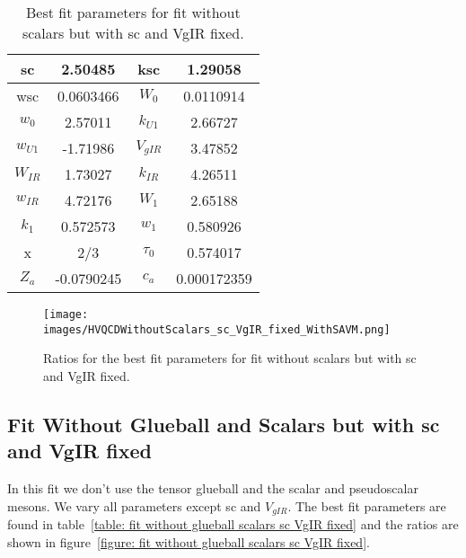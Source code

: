 \documentclass[10 pt]{article}
\begin{document}
\begin{table}
\centering
\begin{tabular}{ | c | c | c | c |}
\hline
sc & 2.50485 & ksc & 1.29058 \\
\hline
wsc & 0.0603466 & $W_0$ & 0.0110914 \\
\hline
$w_0$ & 2.57011 & $k_{U1}$ & 2.66727  \\
\hline
$w_{U1}$ & -1.71986 & $V_{gIR}$ & 3.47852 \\
\hline
$W_{IR}$ & 1.73027 & $k_{IR}$ & 4.26511 \\
\hline
$w_{IR}$ & 4.72176 & $W_1$ & 2.65188 \\
\hline
$k_1$ & 0.572573 & $w_1$ & 0.580926 \\
\hline
x & 2/3& $\tau_0$ & 0.574017\\
\hline
$Z_a$ & -0.0790245 & $c_a$ & 0.000172359 \\
\hline
\end{tabular}
\caption{Best fit parameters for fit without scalars but with sc and VgIR fixed.}
\label{table: fit without scalars sc VgIR fixed} 
\end{table}

\begin{figure}
  \center
  \texttt{[image: images/HVQCDWithoutScalars\_sc\_VgIR\_fixed\_WithSAVM.png]} 
  \caption{Ratios for the best fit parameters for fit without scalars but with sc and VgIR fixed.}
  \label{figure: fit without scalars sc VgIR fixed}
\end{figure}


\subsection{Fit Without Glueball and Scalars but with sc and VgIR fixed}

In this fit we don't use the tensor glueball and the scalar and pseudoscalar mesons. We vary all parameters except sc and $V_{gIR}$. The best fit parameters are found in table~\ref{table: fit without glueball scalars sc VgIR fixed} and the ratios are shown in figure~\ref{figure: fit without glueball scalars sc VgIR fixed}.
\end{document}
